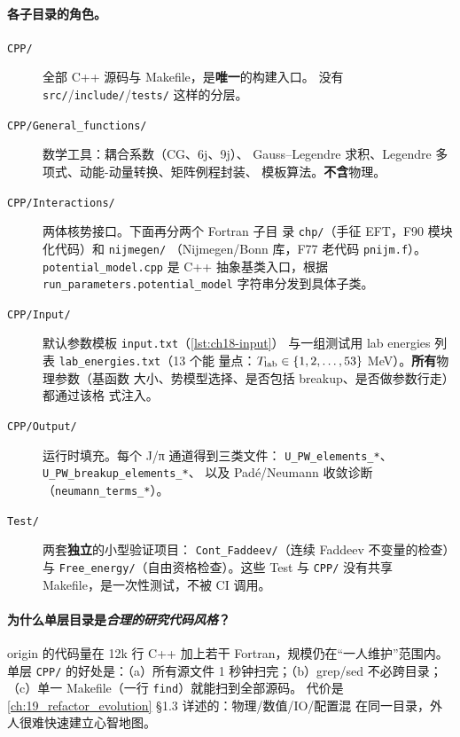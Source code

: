 \paragraph{各子目录的角色。}
\begin{description}
\item[\texttt{CPP/}] 全部 C++ 源码与 Makefile，是\textbf{唯一}的构建入口。
        没有 \texttt{src/}/\texttt{include/}/\texttt{tests/} 这样的分层。
\item[\texttt{CPP/General\_functions/}] 数学工具：耦合系数（CG、6j、9j）、
        Gauss--Legendre 求积、Legendre 多项式、动能-动量转换、矩阵例程封装、
        模板算法。\textbf{不含}物理。
\item[\texttt{CPP/Interactions/}] 两体核势接口。下面再分两个 Fortran 子目
        录 \texttt{chp/}（手征 EFT，F90 模块化代码）和 \texttt{nijmegen/}
        （Nijmegen/Bonn 库，F77 老代码 \texttt{pnijm.f}）。
        \texttt{potential\_model.cpp} 是 C++ 抽象基类入口，根据
        \texttt{run\_parameters.potential\_model} 字符串分发到具体子类。
\item[\texttt{CPP/Input/}] 默认参数模板 \texttt{input.txt}（\cref{lst:ch18-input}）
        与一组测试用 lab energies 列表 \texttt{lab\_energies.txt}（13 个能
        量点：${T_{\text{lab}}} \in \{1, 2, \ldots, 53\}$ MeV）。\textbf{所有}物理参数（基函数
        大小、势模型选择、是否包括 breakup、是否做参数行走）都通过该格
        式注入。
\item[\texttt{CPP/Output/}] 运行时填充。每个 J/π 通道得到三类文件：
        \texttt{U\_PW\_elements\_*}、\texttt{U\_PW\_breakup\_elements\_*}、
        以及 Padé/Neumann 收敛诊断（\texttt{neumann\_terms\_*}）。
\item[\texttt{Test/}] 两套\textbf{独立}的小型验证项目：
        \texttt{Cont\_Faddeev/}（连续 Faddeev 不变量的检查）与
        \texttt{Free\_energy/}（自由资格检查）。这些 Test 与 \texttt{CPP/}
        没有共享 Makefile，是一次性测试，不被 CI 调用。
\end{description}

\paragraph{为什么单层目录是\emph{合理的研究代码风格}？}
origin 的代码量在 12k 行 C++ 加上若干 Fortran，规模仍在“一人维护”范围内。
单层 \texttt{CPP/} 的好处是：（a）所有源文件 1 秒钟扫完；（b）grep/sed
不必跨目录；（c）单一 Makefile（一行 \texttt{find}）就能扫到全部源码。
代价是 \cref{ch:19_refactor_evolution} §1.3 详述的：物理/数值/IO/配置混
在同一目录，外人很难快速建立心智地图。

